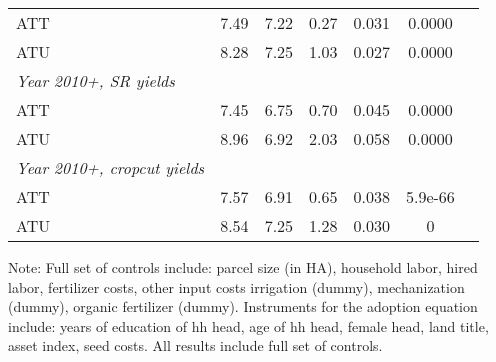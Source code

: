 \begin{table}[H]
\begin{threeparttable}
\begin{tabular}{l cccccc}
ATT         &        7.49&        7.22&        0.27&       0.031&      0.0000\\
%
%
%
ATU         &        8.28&        7.25&        1.03&       0.027&      0.0000\\
%
%
%
\textit{Year 2010+, SR yields}&            &            &            &            &            \\
ATT         &        7.45&        6.75&        0.70&       0.045&      0.0000\\
%
%
%
ATU         &        8.96&        6.92&        2.03&       0.058&      0.0000\\
%
%
%
\textit{Year 2010+, cropcut yields}&            &            &            &            &            \\
ATT         &        7.57&        6.91&        0.65&       0.038&     5.9e-66\\
%
%
%
ATU         &        8.54&        7.25&        1.28&       0.030&           0\\
\hline
\hline
\end{tabular}
\begin{tablenotes}
\footnotesize
\item{Note: Full set of controls include: parcel size (in HA), household labor, hired labor, fertilizer costs, other input costs irrigation (dummy), mechanization (dummy), organic fertilizer (dummy). Instruments for the adoption equation include: years of education of hh head, age of hh head, female head, land title, asset index, seed costs. All results include full set of controls. }
\end{tablenotes}
\end{threeparttable}
\end{table}
